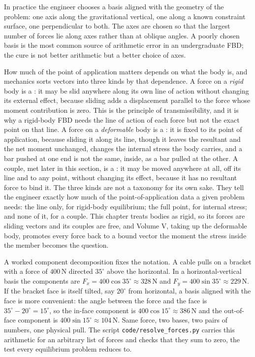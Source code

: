 In practice the engineer chooses a basis aligned with the geometry of
the problem: one axis along the gravitational vertical, one along a
known constraint surface, one perpendicular to both. The axes are
chosen so that the largest number of forces lie along axes rather than
at oblique angles. A poorly chosen basis is the most common source of
arithmetic error in an undergraduate FBD; the cure is not better
arithmetic but a better choice of axes.

How much of the point of application matters depends on what the body is, and
mechanics sorts vectors into three kinds by that dependence. A force on a
\emph{rigid} body is a : it may be slid anywhere along
its own line of action without changing its external effect, because sliding
adds a displacement parallel to the force whose moment contribution is zero.
This is the principle of transmissibility, and it is why a rigid-body FBD needs
the line of action of each force but not the exact point on that line. A force
on a \emph{deformable} body is a : it is fixed to its
point of application, because sliding it along its line, though it leaves the
resultant and the net moment unchanged, changes the internal stress the body
carries, and a bar pushed at one end is not the same, inside, as a bar pulled
at the other. A couple, met later in this section, is a :
it may be moved anywhere at all, off its line and to any point, without changing
its effect, because it has no resultant force to bind it. The three kinds are
not a taxonomy for its own sake. They tell the engineer exactly how much of the
point-of-application data a given problem needs: the line only, for
rigid-body equilibrium; the full point, for internal stress; and none of it,
for a couple. This chapter treats bodies as rigid, so its forces are sliding
vectors and its couples are free, and Volume V, taking up the deformable body,
promotes every force back to a bound vector the moment the stress inside the
member becomes the question.



A worked component decomposition fixes the notation. A cable pulls on a
bracket with a force of $400\,\text{N}$ directed $35^{\circ}$ above the
horizontal. In a horizontal-vertical basis the components are
$F_x = 400\cos 35^{\circ} \approx 328\,\text{N}$ and
$F_y = 400\sin 35^{\circ} \approx 229\,\text{N}$. If the bracket face
is itself tilted, say $20^{\circ}$ from horizontal, a basis aligned
with the face is more convenient: the angle between the force and the
face is $35^{\circ} - 20^{\circ} = 15^{\circ}$, so the in-face
component is $400\cos 15^{\circ} \approx 386\,\text{N}$ and the
out-of-face component is $400\sin 15^{\circ} \approx 104\,\text{N}$.
Same force, two bases, two pairs of numbers, one physical pull. The
script \texttt{code/resolve\_forces.py} carries this arithmetic for an
arbitrary list of forces and checks that they sum to zero, the test
every equilibrium problem reduces to.

